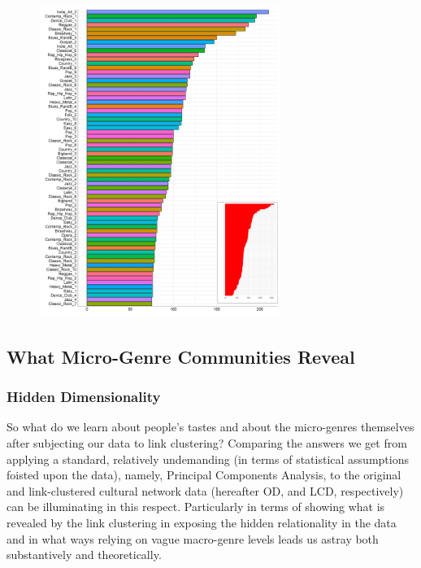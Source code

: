 \documentclass[a4paper,12pt]{extarticle}
\begin{document}
 \begin{figure}[ht!]
 \centering
 \includegraphics[width=0.7\textwidth]{Figs/Link Clust/micro-genre-size-dist.png}
 \caption{}
  \label{fig:size-dist}
 \end{figure}
 
\subsection{What Micro-Genre Communities Reveal}
\subsubsection{Hidden Dimensionality}
So what do we learn about people's tastes and about the micro-genres themselves after subjecting our data to link clustering? Comparing the answers we get from applying a standard, relatively undemanding (in terms of statistical assumptions foisted upon the data), namely, Principal Components Analysis, to the original and link-clustered cultural network data (hereafter OD, and LCD, respectively) can be illuminating in this respect. Particularly in terms of showing what is revealed by the link clustering in exposing the hidden relationality in the data and in what ways relying on vague macro-genre levels leads us astray both substantively and theoretically.
\end{document}
